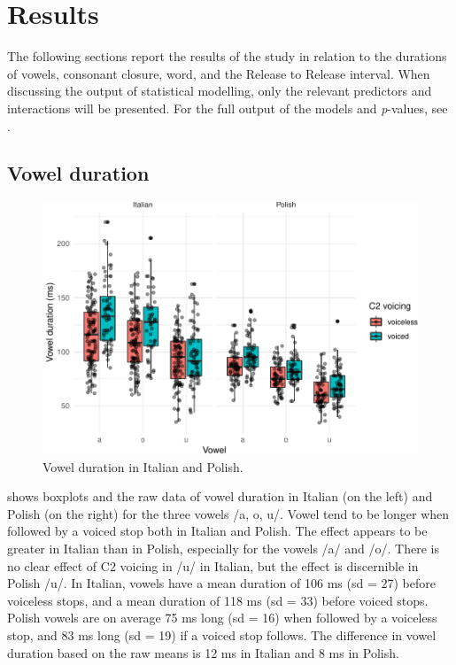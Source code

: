 \documentclass[preprint]{JASAnew}
\begin{document}
\hypertarget{results}{%
\section{Results}\label{results}}

The following sections report the results of the study in relation to
the durations of vowels, consonant closure, word, and the Release to
Release interval. When discussing the output of statistical modelling,
only the relevant predictors and interactions will be presented. For the
full output of the models and \emph{p}-values, see .

\hypertarget{vowel-duration}{%
\subsection{Vowel duration}\label{vowel-duration}}

\begin{figure}
\includegraphics{2018-jasa_files/figure-latex/vowels-plot-1} \caption{Vowel duration in Italian and Polish.}\label{f:vowels-plot}
\end{figure}

 shows boxplots and the raw data of vowel duration
in Italian (on the left) and Polish (on the right) for the three vowels
/a, o, u/. Vowel tend to be longer when followed by a voiced stop both
in Italian and Polish. The effect appears to be greater in Italian than
in Polish, especially for the vowels /a/ and /o/. There is no clear
effect of C2 voicing in /u/ in Italian, but the effect is discernible in
Polish /u/. In Italian, vowels have a mean duration of 106 ms (sd = 27)
before voiceless stops, and a mean duration of 118 ms (sd = 33) before
voiced stops. Polish vowels are on average 75 ms long (sd = 16) when
followed by a voiceless stop, and 83 ms long (sd = 19) if a voiced stop
follows. The difference in vowel duration based on the raw means is 12
ms in Italian and 8 ms in Polish.
\end{document}

